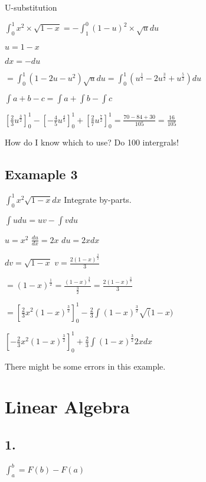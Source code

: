 \documentclass[12pt,a4paper]{article}
\begin{document}
U-substitution

\noindent $\int_{0}^{1} x^2 \times \sqrt{1 - x} = - \int_{1}^{0} (1 - u)^2 \times \sqrt{u} du$

\noindent $\boxed{u = 1 - x}$

\noindent $\boxed{dx = -du}$

\noindent $= \int_{0}^{1} (1-2u-u^2)\sqrt{u} du = \int_{0}^{1} (u^\frac{1}{2} - 2u^\frac{3}{2} + u^\frac{5}{2}) du$

\noindent $\int a + b - c = \int a + \int b - \int c$

\noindent $[\frac{2}{3}u^\frac{3}{2}]_{0}^{1} - [-\frac{4}{5}u^\frac{4}{5}]_{0}^{1} + [\frac{2}{7} u^\frac{7}{2}]_{0}^{1} = \frac{70 - 84 + 30}{105} = \boxed{\frac{16}{105}}$
\newline

\noindent How do I know which to use? Do 100 intergrals!

\newpage

\subsection*{Examaple 3}

$\int_{0}^{1} x^2 \sqrt{1 - x} dx$ Integrate by-parts.

\noindent $\boxed{\int u du = uv - \int v du}$

\noindent $u = x^2$ $\frac{du}{dx} = 2x$ $du = 2xdx$

\noindent $dv = \sqrt{1 - x}$ $v = \frac{2(1-x)^\frac{3}{2}}{3}$

\noindent $=(1-x)^\frac{1}{2} = \frac{(1-x)^\frac{3}{2}}{\frac{3}{2}} = \frac{2(1-x)^\frac{3}{2}}{3}$

\noindent $=[\frac{2}{3} x^2 (1-x)^\frac{3}{2}]_{0}^{1} - \frac{2}{3} \int (1 - x)^\frac{3}{2} \sqrt(1-x)$

\noindent $[-\frac{2}{3} x^2 (1 - x)^\frac{3}{2}]_{0}^{1} + \frac{2}{3} \int (1-x)^\frac{3}{2} 2x dx$
\newline

\noindent There might be some errors in this example.

\section*{Linear Algebra}
\subsection*{1.}

$\int_{a}^{b} = F(b) - F(a)$
\newline
\end{document}
